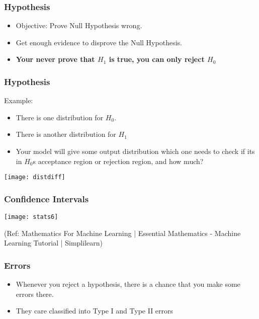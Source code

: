 \begin{frame}[fragile]\frametitle{Hypothesis}
\begin{itemize}
\item Objective: Prove Null Hypothesis wrong.
\item Get enough evidence to disprove the Null Hypothesis.
\item {\bf Your never prove that $H_1$ is true, you can only reject $H_0$}
\end{itemize}
\end{frame}

\begin{frame}[fragile]\frametitle{Hypothesis}
Example:
\begin{itemize}
\item There is one distribution for $H_0$. 
\item There is another distribution for $H_1$
\item Your model will give some output distribution which one needs to check if its in $H_0$s acceptance region or rejection region, and how much?
\end{itemize}
\begin{center}
\texttt{[image: distdiff]}
\end{center}
\end{frame}

\begin{frame}[fragile]\frametitle{Confidence Intervals}
\begin{center}
\texttt{[image: stats6]}
\end{center}

{\tiny (Ref: Mathematics For Machine Learning | Essential Mathematics - Machine Learning Tutorial | Simplilearn)}

\end{frame}



\begin{frame}[fragile]\frametitle{Errors}
\begin{itemize}
\item Whenever you reject a hypothesis, there is a chance that you make some errors there.
\item They care classified into Type I and Type II errors
\end{itemize}
\end{frame}

